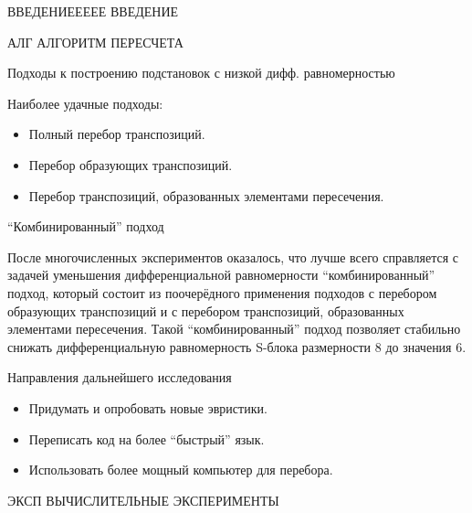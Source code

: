 \documentclass[11pt]{beamer}
\begin{document}



\begin{frame}{ВВЕДЕНИЕЕЕЕЕ}
ВВЕДЕНИЕ
\end{frame}
\begin{frame}{АЛГ}
АЛГОРИТМ ПЕРЕСЧЕТА
\end{frame}

\begin{frame}{Подходы к построению подстановок с низкой дифф. равномерностью}

Наиболее удачные подходы:

\begin{itemize}
\item Полный перебор транспозиций.
\item Перебор образующих транспозиций.
\item Перебор транспозиций, образованных элементами пересечения.
\end{itemize}

\end{frame}





\begin{frame}{``Комбинированный'' подход}

После многочисленных экспериментов оказалось, что лучше всего справляется с задачей уменьшения дифференциальной равномерности ``комбинированный'' подход, который состоит из поочерёдного применения подходов с перебором образующих транспозиций и с перебором транспозиций, образованных элементами пересечения. Такой ``комбинированный'' подход позволяет стабильно снижать дифференциальную равномерность S-блока размерности 8 до значения 6.

\end{frame}


\begin{frame}{Направления дальнейшего исследования}

\begin{itemize}
\item Придумать и опробовать новые эвристики.
\item Переписать код на более ``быстрый'' язык.
\item Использовать более мощный компьютер для перебора.
\end{itemize}

\end{frame}

\begin{frame}{ЭКСП}
ВЫЧИСЛИТЕЛЬНЫЕ ЭКСПЕРИМЕНТЫ
\end{frame}
\end{document}
